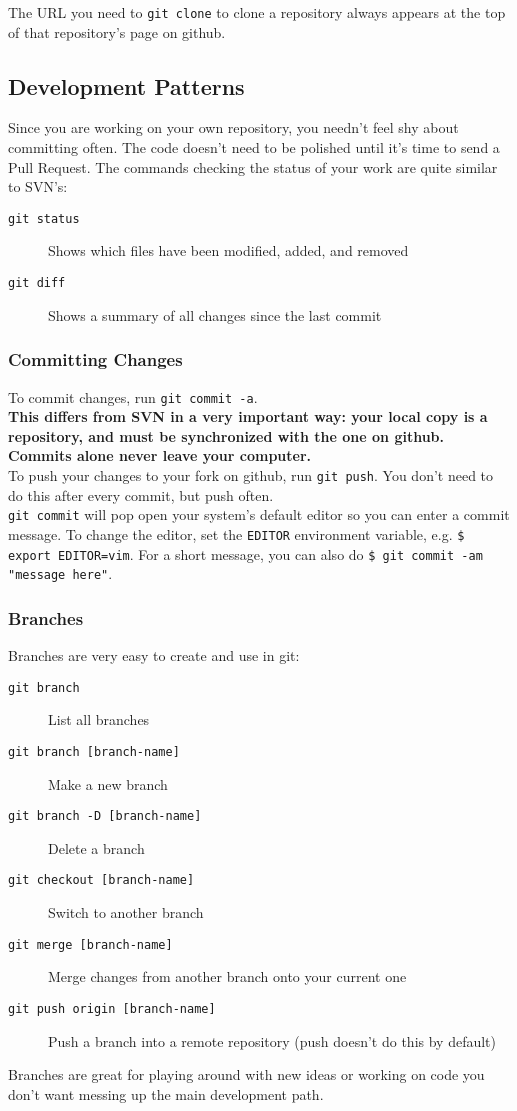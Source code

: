 \documentclass{article}
\begin{document}
The URL you need to {\tt git clone} to clone a repository always appears at the top of that repository's page on github.

\subsection{Development Patterns}
\label{patterns}
Since you are working on your own repository, you needn't feel shy about committing often. The code doesn't need to be polished until it's time to send a Pull Request. The commands checking the status of your work are quite similar to SVN's:
\begin{description}
\item[{\tt git status}] Shows which files have been modified, added, and removed
\item[{\tt git diff}] Shows a summary of all changes since the last commit
\end{description}

\subsubsection{Committing Changes}
To commit changes, run  {\tt git commit -a}.\\

{\bf This differs from SVN in a very important way: your local copy is a repository, and must be synchronized with the one on github. Commits alone never leave your computer.}\\

To push your changes to your fork on github, run {\tt git push}. You don't need to do this after every commit, but push often.\\

{\tt git commit} will pop open your system's default editor so you can enter a commit message. To change the editor, set the {\tt EDITOR} environment variable, e.g. {\tt \$ export EDITOR=vim}. For a short message, you can also do {\tt \$ git commit -am "message here"}.

\subsubsection{Branches}
Branches are very easy to create and use in git:
\begin{description}
\item[{\tt git branch}] List all branches
\item[{\tt git branch [branch-name]}] Make a new branch
\item[{\tt git branch -D [branch-name]}] Delete a branch
\item[{\tt git checkout [branch-name]}] Switch to another branch
\item[{\tt git merge [branch-name]}] Merge changes from another branch onto your current one
\item[{\tt git push origin [branch-name]}] Push a branch into a remote repository (push doesn't do this by default)
\end{description}
Branches are great for playing around with new ideas or working on code you don't want messing up the main development path.
\end{document}
